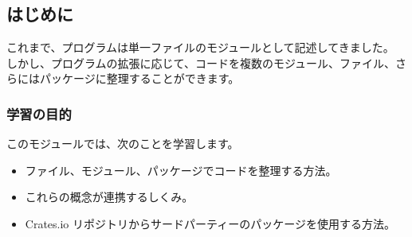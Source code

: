 \subsection{はじめに}

これまで、プログラムは単一ファイルのモジュールとして記述してきました。 しかし、プログラムの拡張に応じて、コードを複数のモジュール、ファイル、さらにはパッケージに整理することができます。

\subsubsection{学習の目的}

このモジュールでは、次のことを学習します。

\begin{itemize}
\item ファイル、モジュール、パッケージでコードを整理する方法。
\item これらの概念が連携するしくみ。
\item Crates.io リポジトリからサードパーティーのパッケージを使用する方法。
\end{itemize}